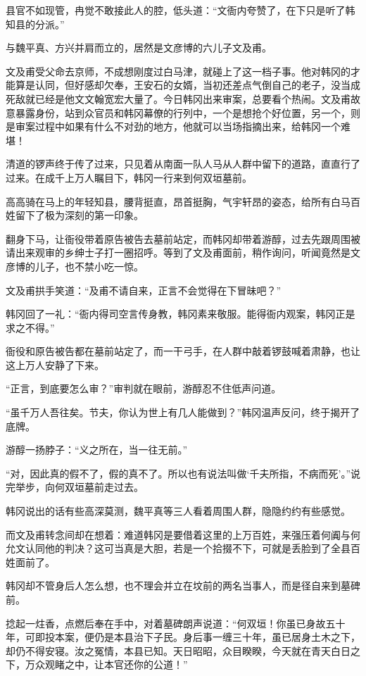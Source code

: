 县官不如现管，冉觉不敢接此人的腔，低头道：“文衙内夸赞了，在下只是听了韩知县的分派。”

与魏平真、方兴并肩而立的，居然是文彦博的六儿子文及甫。

文及甫受父命去京师，不成想刚度过白马津，就碰上了这一档子事。他对韩冈的才能算是认同，但好感却欠奉，王安石的女婿，当初还差点气倒自己的老子，没当成死敌就已经是他文文翰宽宏大量了。今日韩冈出来审案，总要看个热闹。文及甫故意暴露身份，站到众官员和韩冈幕僚的行列中，一个是想抢个好位置，另一个，则是审案过程中如果有什么不对劲的地方，他就可以当场指摘出来，给韩冈一个难堪！

清道的锣声终于传了过来，只见着从南面一队人马从人群中留下的道路，直直行了过来。在成千上万人瞩目下，韩冈一行来到何双垣墓前。

高高骑在马上的年轻知县，腰背挺直，昂首挺胸，气宇轩昂的姿态，给所有白马百姓留下了极为深刻的第一印象。

翻身下马，让衙役带着原告被告去墓前站定，而韩冈却带着游醇，过去先跟周围被请出来观审的乡绅士子打一圈招呼。等到了文及甫面前，稍作询问，听闻竟然是文彦博的儿子，也不禁小吃一惊。

文及甫拱手笑道：“及甫不请自来，正言不会觉得在下冒昧吧？”

韩冈回了一礼：“衙内得司空言传身教，韩冈素来敬服。能得衙内观案，韩冈正是求之不得。”

衙役和原告被告都在墓前站定了，而一干弓手，在人群中敲着锣鼓喊着肃静，也让这上万人安静了下来。

“正言，到底要怎么审？”审判就在眼前，游醇忍不住低声问道。

“虽千万人吾往矣。节夫，你认为世上有几人能做到？”韩冈温声反问，终于揭开了底牌。

游醇一扬脖子：“义之所在，当一往无前。”

“对，因此真的假不了，假的真不了。所以也有说法叫做‘千夫所指，不病而死’。”说完举步，向何双垣墓前走过去。

韩冈说出的话有些高深莫测，魏平真等三人看着周围人群，隐隐约约有些感觉。

而文及甫转念间却在想着：难道韩冈是要借着这里的上万百姓，来强压着何阗与何允文认同他的判决？这可当真是大胆，若是一个拾掇不下，可就是丢脸到了全县百姓面前了。

韩冈却不管身后人怎么想，也不理会并立在坟前的两名当事人，而是径自来到墓碑前。

捻起一炷香，点燃后奉在手中，对着墓碑朗声说道：“何双垣！你虽已身故五十年，可即投本案，便仍是本县治下子民。身后事一缠三十年，虽已居身土木之下，却仍不得安寝。汝之冤情，本县已知。天日昭昭，众目睽睽，今天就在青天白日之下，万众观睹之中，让本官还你的公道！”

